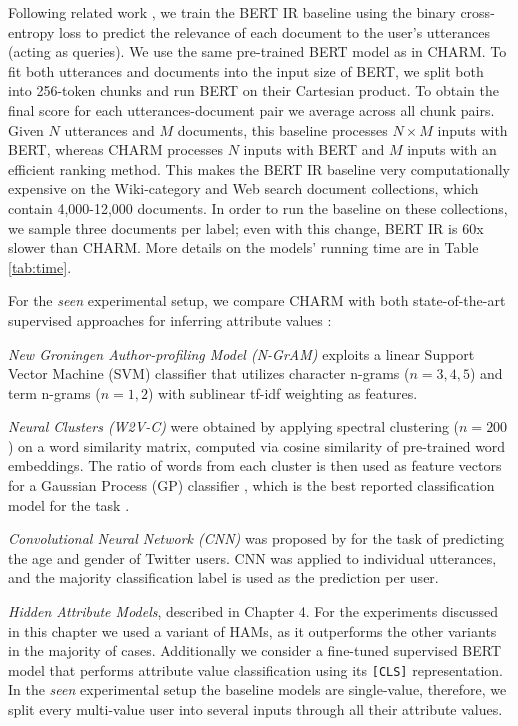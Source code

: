 Following related work \cite{nogueira2019passage, dai2019deeper}, we train the BERT IR baseline using the binary cross-entropy loss to predict the relevance of each document to the user's utterances (acting as queries).
We use the same pre-trained BERT model as in CHARM.
To fit both utterances and documents into the input size of BERT, we split both into 256-token chunks and run BERT on their Cartesian product. To obtain the final score for each utterances-document pair we average across all chunk pairs.
Given $N$ utterances and $M$ documents, this baseline processes $N \times M$ inputs with BERT, whereas CHARM processes $N$ inputs with BERT and $M$ inputs with an efficient ranking method.
This makes the BERT IR baseline very computationally expensive on the Wiki-category and Web search document collections, which contain 4,000-12,000 documents.
In order to run the baseline on these collections, we sample three documents per label; even with this change, BERT IR is 60x slower than CHARM. More details on the models' running time are in Table \ref{tab:time}.

For the \emph{seen} experimental setup, we compare CHARM with both state-of-the-art supervised approaches for inferring attribute values
:
\squishlist
    \item \emph{New Groningen Author-profiling Model (N-GrAM)} \cite{basile:2017} exploits a linear Support Vector Machine (SVM) classifier \cite{cortes1995support} that utilizes character n-grams ($n=3,4,5$) and term n-grams ($n=1,2$) with sublinear tf-idf weighting as features. 
    \item \emph{Neural Clusters (W2V-C)} \cite{pietro:ACL15} were obtained by applying spectral clustering ($n=200$) on a word similarity matrix, computed via cosine similarity of pre-trained word embeddings. The ratio of words from each cluster is then used as feature vectors for a Gaussian Process (GP) classifier \cite{chu2005gaussian}, which is the best reported classification model for the task \cite{pietro:ACL15}. 
    \item \emph{Convolutional Neural Network (CNN)} \cite{bayot:MOD17} was proposed by \citeauthor{bayot:MOD17} for the task of predicting the age and gender of Twitter users. CNN was applied to individual utterances, and the majority classification label is used as the prediction per user.
    \item \emph{Hidden Attribute Models}, described in Chapter 4. For the experiments discussed in this chapter we used a  variant of HAMs, as it outperforms the other variants in the majority of cases.
\squishend
Additionally we consider a fine-tuned supervised BERT model that performs attribute value classification using its \texttt{[CLS]} representation.
In the \textit{seen} experimental setup the baseline models are single-value, therefore, we split every multi-value user into several inputs through all their attribute values.

